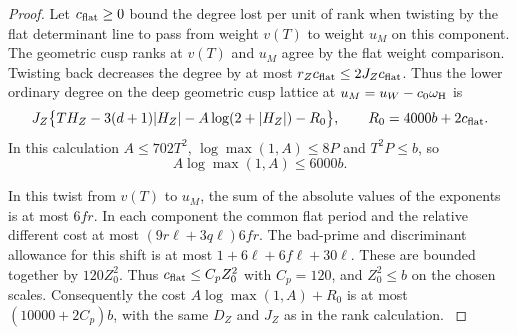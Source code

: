 \begin{proof}
Let \(c_{\rm flat}\ge0\) bound the degree lost per unit of rank
when twisting by the flat determinant line to pass from weight \(v(T)\)
to weight \(u_M\) on this component.
The geometric cusp ranks at \(v(T)\) and \(u_M\) agree by
the flat weight comparison.
Twisting back decreases the degree by at most \(r_Z c_{\rm flat}\le
2J_Z c_{\rm flat}\). Thus the lower ordinary degree on the
deep geometric cusp lattice at \(u_M=u_W-c_0\omega_{\rm H}\) is
\begin{equation}
  J_Z\big\{T H_Z-3(d+1)|H_Z|
       -A\log(2+|H_Z|)-R_0\big\},
  \qquad R_0=4000b+2c_{\rm flat}.
  \label{eq:deep-hs-budget}
\end{equation}
In this calculation \(A\le702T^2\),
\(\log\max(1,A)\le8P\) and \(T^2P\le b\),
so
\[
 A\log\max(1,A)\le6000b.
\]

In this twist from \(v(T)\) to \(u_M\), the sum of the absolute
values of the exponents is at most \(6fr\).
In each component the common flat period and the
relative different cost at most
\((9r\ell+3q\ell)6fr\). The bad-prime and discriminant
allowance for this shift is at most \(1+6\ell+6f\ell+30\ell\).
These are bounded together by \(120 Z_0^2\).
Thus \(c_{\rm flat}\le C_p Z_0^2\) with \(C_p=120\),
and \(Z_0^2\le b\) on the chosen scales.
Consequently the cost \(A\log\max(1,A)+R_0\)
is at most \((10000+2C_p)b\), with the same \(D_Z\)
and \(J_Z\) as in the rank calculation.
\label{cor:covolume-hilbert-samuel-5}
\end{proof}
